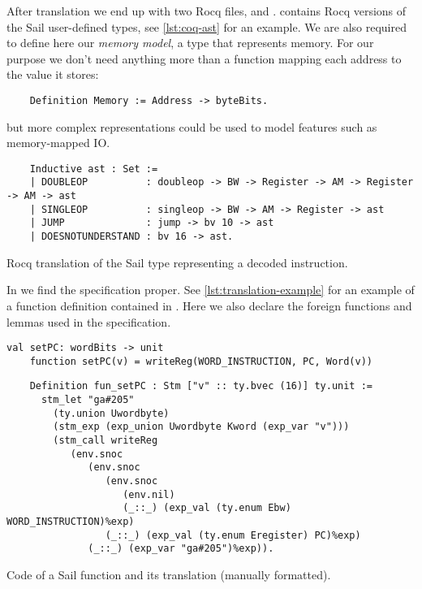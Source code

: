 After translation we end up with two Rocq files,  and .  contains Rocq versions of the Sail user-defined types, see \cref{lst:coq-ast} for an example. We are also required to define here our \emph{memory model}, \ie a type that represents memory. For our purpose we don't need anything more than a function mapping each address to the value it stores:
\begin{verbatim}
    Definition Memory := Address -> byteBits.
\end{verbatim}
but more complex representations could be used to model features such as memory-mapped IO.

\begin{listing}
  \begin{verbatim}
    Inductive ast : Set :=
    | DOUBLEOP          : doubleop -> BW -> Register -> AM -> Register -> AM -> ast
    | SINGLEOP          : singleop -> BW -> AM -> Register -> ast
    | JUMP              : jump -> bv 10 -> ast
    | DOESNOTUNDERSTAND : bv 16 -> ast.
  \end{verbatim}
  \caption{Rocq translation of the Sail type representing a decoded instruction.}
  \label{lst:coq-ast}
\end{listing}

In  we find the \usail specification proper. See \cref{lst:translation-example} for an example of a \usail function definition contained in . Here we also declare the foreign functions and lemmas used in the specification.

\begin{listing}[h]
  \begin{lstlisting}[language=sail]
    val setPC: wordBits -> unit
    function setPC(v) = writeReg(WORD_INSTRUCTION, PC, Word(v))
  \end{lstlisting}
  \begin{verbatim}
    Definition fun_setPC : Stm ["v" :: ty.bvec (16)] ty.unit :=
      stm_let "ga#205"
        (ty.union Uwordbyte)
        (stm_exp (exp_union Uwordbyte Kword (exp_var "v")))
        (stm_call writeReg
           (env.snoc
              (env.snoc
                 (env.snoc
                    (env.nil)
                    (_::_) (exp_val (ty.enum Ebw) WORD_INSTRUCTION)%exp)
                 (_::_) (exp_val (ty.enum Eregister) PC)%exp)
              (_::_) (exp_var "ga#205")%exp)).
  \end{verbatim}
  \caption{Code of a Sail function and its \usail translation (manually formatted).}
  \label{lst:translation-example}
\end{listing}

